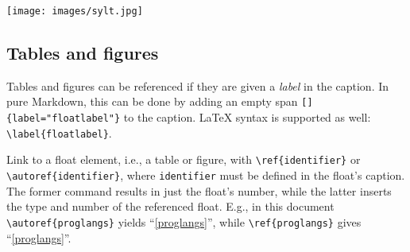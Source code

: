 \documentclass[10pt,a4paper,onecolumn]{article}
\let\origfigure\figure
\let\endorigfigure\endfigure
\renewenvironment{figure}[1][2] {
    \expandafter\origfigure\expandafter[H]
} {
    \endorigfigure
}
\begin{document}
\begin{figure}
\centering
\texttt{[image: images/sylt.jpg]}
\caption{View of coastal dunes in a nature reserve on Sylt, an island in
the North Sea. Sylt (Danish: \emph{Slid}) is Germany's northernmost
island.}\label{sylt}
\end{figure}

\subsection{Tables and figures}\label{tables-and-figures}

Tables and figures can be referenced if they are given a \emph{label} in
the caption. In pure Markdown, this can be done by adding an empty span
\texttt{{[}{]}\{label="floatlabel"\}} to the caption. LaTeX syntax is
supported as well: \texttt{\textbackslash{}label\{floatlabel\}}.

Link to a float element, i.e., a table or figure, with
\texttt{\textbackslash{}ref\{identifier\}} or
\texttt{\textbackslash{}autoref\{identifier\}}, where
\texttt{identifier} must be defined in the float's caption. The former
command results in just the float's number, while the latter inserts the
type and number of the referenced float. E.g., in this document
\texttt{\textbackslash{}autoref\{proglangs\}} yields
``\autoref{proglangs}'', while \texttt{\textbackslash{}ref\{proglangs\}}
gives ``\ref{proglangs}''.
\end{document}
